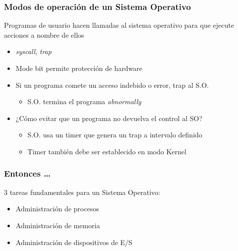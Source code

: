 \documentclass[letter]{beamer}
\begin{document}
\begin{frame}
  \frametitle{Modos de operación de un Sistema Operativo}

  Programas de usuario hacen llamadas al sistema operativo
  para que ejecute acciones a nombre de ellos
  
  \begin{itemize}
    \item {\em syscall}, {\em trap}
  \end{itemize}
  
  
  \begin{itemize}
    \item<3-> Mode bit permite protección de hardware
    \item<4-> Si un programa comete un acceso indebido o error, trap al S.O.
      \begin{itemize}
        \item S.O. termina el programa {\em abnormally}
      \end{itemize}
    \item<5-> ¿Cómo evitar que un programa no devuelva el control al SO?
      \begin{itemize}
        \item<6-> S.O. usa un timer que genera un trap a intervalo definido
        \item<6-> Timer también debe ser establecido en modo Kernel
      \end{itemize}
  \end{itemize}

\end{frame}

\begin{frame}
  \frametitle{Entonces \ldots}

  3 tareas fundamentales para un Sistema Operativo:
  
  \begin{itemize}
    \item Administración de procesos
    \item Administración de memoria
    \item Administración de dispositivos de E/S
  \end{itemize}
\end{frame}
\end{document}
